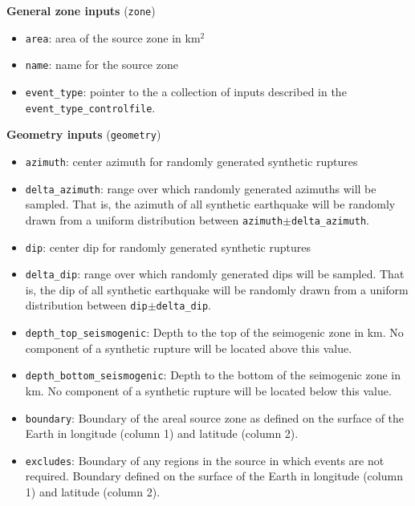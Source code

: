 \textbf{General zone inputs} (\texttt{zone})
\begin{itemize}
\item \texttt{area}: area of the source zone in km$^2$ \\
\item \texttt{name}: name for the source zone \\
\item \texttt{event\_type}: pointer to the a collection of inputs described in the
\texttt{event}\texttt{\_type}\texttt{\_controlfile}.
\end{itemize}

\textbf{Geometry inputs} (\texttt{geometry})
\begin{itemize}
\item \texttt{azimuth}: center azimuth for randomly generated synthetic ruptures \\
\item \texttt{delta\_azimuth}: range over which randomly generated azimuths will
be sampled. That is, the azimuth of all synthetic earthquake will be randomly drawn
from a uniform distribution between \texttt{azimuth}$\pm$\texttt{delta\_azimuth}. \\
\item \texttt{dip}: center dip for randomly generated synthetic ruptures \\
\item \texttt{delta\_dip}: range over which randomly generated dips will
be sampled. That is, the dip of all synthetic earthquake will be
randomly drawn from a uniform distribution between \texttt{dip}$\pm$\texttt{delta\_dip}.\\
\item \texttt{depth\_top\_seismogenic}: Depth to the top of the seimogenic zone in km.
No component of a synthetic rupture will be located above this value. \\
\item \texttt{depth\_bottom\_seismogenic}: Depth to the bottom of the seimogenic zone in km.
No component of a synthetic rupture will be located below this value. \\
\item \texttt{boundary}: Boundary of the areal source zone as
defined on the surface of the Earth in longitude (column 1) and
latitude (column 2). \\
\item \texttt{excludes}: Boundary of any regions in the source in
which events are not required. Boundary defined on the surface of
the Earth in longitude (column 1) and latitude (column 2).
\end{itemize}

